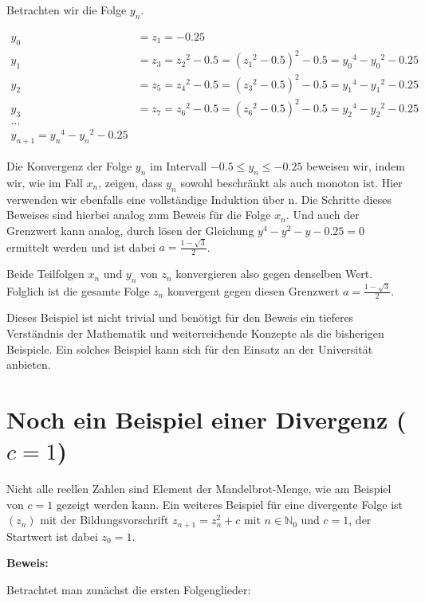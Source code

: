 \documentclass[a4paper, 12pt]{book}
\begin{document}
Betrachten wir die Folge \(y_{n}\).

\begin{align*}
y_{0} &= z_{1} =  - 0.25\\
y_{1} &= z_{3} = {z_{2}}^{2} - 0.5 = ({z_{1}}^{2} - 0.5)^{2} - 0.5 = {y_{0}}^{4} - {y_{0}}^{2} - 0.25\\
y_{2} &= z_{5} = {z_{4}}^{2} - 0.5 = ({z_{3}}^{2} - 0.5)^{2} - 0.5 = {y_{1}}^{4} - {y_{1}}^{2} - 0.25\\
y_{3} &= z_{7} = {z_{6}}^{2} - 0.5 = ({z_{6}}^{2} - 0.5)^{2} - 0.5 = {y_{2}}^{4} - {y_{2}}^{2} - 0.25\\
...\\
y_{n + 1} = {y_{n}}^{4} - {y_{n}}^{2} - 0.25
\end{align*}

Die Konvergenz der Folge \(y_{n}\) im Intervall
\(- 0.5{\leq y}_{n} \leq  - 0.25\) beweisen wir, indem wir,
wie im Fall \(x_{n}\), zeigen, dass \(y_{n}\) sowohl beschränkt als auch
monoton ist. Hier verwenden wir ebenfalls eine vollständige Induktion
über n. Die Schritte dieses Beweises sind hierbei analog zum Beweis für
die Folge \(x_{n}\). Und auch der Grenzwert kann analog, durch lösen der
Gleichung \(y^{4} - y^{2} - y - 0.25 = 0\) ermittelt
werden und ist dabei \(a = \frac{1 - \sqrt{3}}{2}\).

Beide Teilfolgen \(x_{n}\) und \(y_{n}\) von \(z_{n}\) konvergieren also
gegen denselben Wert. Folglich ist die gesamte Folge \(z_{n}\)
konvergent gegen diesen Grenzwert \(a = \frac{1 - \sqrt{3}}{2}\).
\hfill\blacksquare

Dieses Beispiel ist nicht trivial und benötigt für den Beweis ein
tieferes Verständnis der Mathematik und weiterreichende Konzepte als die
bisherigen Beispiele. Ein solches Beispiel kann sich für den Einsatz an
der Universität anbieten.

\section{Noch ein Beispiel einer Divergenz ($c=1$)}

Nicht alle reellen Zahlen sind Element der Mandelbrot-Menge, wie am
Beispiel von \(c = 1\) gezeigt werden kann. Ein weiteres Beispiel
für eine divergente Folge ist \(\left( z_{n} \right)\) mit der
Bildungsvorschrift \(z_{n + 1} = z_{n}^{2} + c\) mit
\(n \in \mathbb{N}_{0}\) und \(c = 1\), der Startwert ist dabei
\(z_{0} = 1\).

\textbf{Beweis:}

Betrachtet man zunächst die ersten Folgenglieder:
\end{document}

